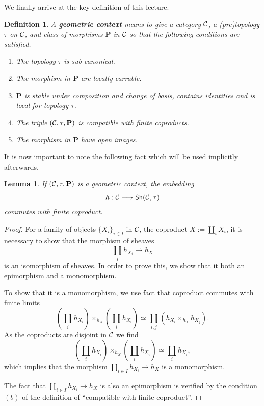 \documentclass{tufte-book} %
\numberwithin{dummy}{section}
\newtheorem{lemma}[thm]{Lemma}
\newtheorem{dfn}[thm]{Definition}
\newcommand{\calc}{{\cal C}}
\newcommand{\lrta}{\longrightarrow}
\newcommand{\ssh}{\mathsf{Sh}}
\newcommand{\bfp}{\mathbf{P}}
\begin{document}
We finally arrive at the key definition of this lecture.
\begin{dfn}\label{dfn:geometric_context}
A \textbf{geometric context} means to give a category $\calc$, a (pre)topology $\tau$ on $\calc$, and class of morphisms $\bfp$ in $\calc$ so that the following conditions are satisfied.
\begin{enumerate}
\item The topology $\tau$ is sub-canonical.
\item The morphism in $\bfp$ are locally carrable.
\item $\bfp$ is stable under composition and change of basis, contains identities and is local for topology $\tau$.
\item The triple $(\calc,\tau,\bfp)$ is compatible with finite coproducts.
\item The morphism in $\bfp$ have open images.
  \end{enumerate}
\end{dfn}
It is now important to note the following fact which will be used implicitly afterwards.
\begin{lemma}
If $(\calc,\tau,\bfp)$ is a geometric context, the embedding 
$$
h:\calc\lrta \ssh(\calc,\tau)
$$
commutes with finite coproduct.
\end{lemma}
\begin{proof}
For a family of objects $\{X_i\}_{i\in I}$ in $\calc$, the coproduct $X:=\coprod_i X_i$, it is necessary to show that the morphism of sheaves
$$
\coprod_i h_{X_i}\lrta h_X
$$
is an isomorphism of sheaves. In order to prove this, we show that it both an epimorphism and a monomorphism.

To show that it is a monomorphism, we use fact that coproduct commutes with finite limits 
$$
\left(\coprod_i h_{X_i}\right)\times_{h_X}\left(\coprod_i h_{X_i}\right)\simeq \coprod_{i,j}(h_{X_i}\times_{h_X}h_{X_j}).
$$
As the coproducts are disjoint in $\calc$ we find
$$
\left(\coprod_i h_{X_i}\right)\times_{h_X}\left(\coprod_i h_{X_i}\right)\simeq \coprod_i h_{X_i},
$$
which implies that the morphism $\coprod_{i\in I} h_{X_i}\lrta h_X$ is a monomorphism.

The fact that $\coprod_{i\in I} h_{X_i}\lrta h_X$ is also an epimorphism is verified by the condition $(b)$ of the definition of ``compatible with finite coproduct''.
\end{proof}
\end{document}

